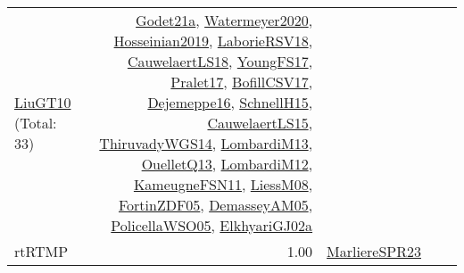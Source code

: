 {\begin{longtable}{p{3cm}r>{\raggedright\arraybackslash}p{6cm}>{\raggedright\arraybackslash}p{6cm}>{\raggedright\arraybackslash}p{8cm}}
\hyperref[detail:LiuGT10]{LiuGT10} (Total: 33) & \hyperref[detail:Godet21a]{Godet21a}, \hyperref[detail:Watermeyer2020]{Watermeyer2020}, \hyperref[detail:Hosseinian2019]{Hosseinian2019}, \hyperref[detail:LaborieRSV18]{LaborieRSV18}, \hyperref[detail:CauwelaertLS18]{CauwelaertLS18}, \hyperref[detail:YoungFS17]{YoungFS17}, \hyperref[detail:Pralet17]{Pralet17}, \hyperref[detail:BofillCSV17]{BofillCSV17}, \hyperref[detail:Dejemeppe16]{Dejemeppe16}, \hyperref[detail:SchnellH15]{SchnellH15}, \hyperref[detail:CauwelaertLS15]{CauwelaertLS15}, \hyperref[detail:ThiruvadyWGS14]{ThiruvadyWGS14}, \hyperref[detail:LombardiM13]{LombardiM13}, \hyperref[detail:OuelletQ13]{OuelletQ13}, \hyperref[detail:LombardiM12]{LombardiM12}, \hyperref[detail:KameugneFSN11]{KameugneFSN11}, \hyperref[detail:LiessM08]{LiessM08}, \hyperref[detail:FortinZDF05]{FortinZDF05}, \hyperref[detail:DemasseyAM05]{DemasseyAM05}, \hyperref[detail:PolicellaWSO05]{PolicellaWSO05}, \hyperref[detail:ElkhyariGJ02a]{ElkhyariGJ02a}\\
\index{rtRTMP}\index{Classification!rtRTMP}rtRTMP &  1.00 & \hyperref[detail:MarliereSPR23]{MarliereSPR23} &  & \\

\end{longtable}}
